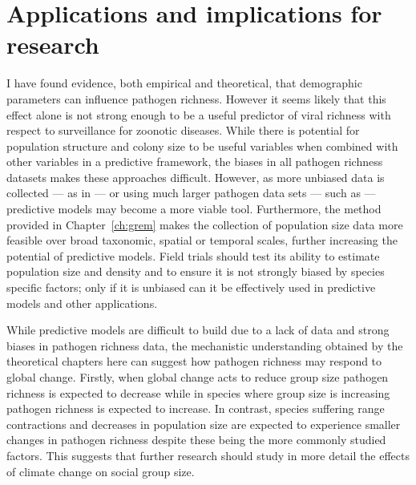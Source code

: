 




\section{Applications and implications for research}

I have found evidence, both empirical and theoretical, that demographic parameters can influence pathogen richness.
However it seems likely that this effect alone is not strong enough to be a useful predictor of viral richness with respect to surveillance for zoonotic diseases.
While there is potential for population structure and colony size to be useful variables when combined with other variables in a predictive framework, the biases in all pathogen richness datasets makes these approaches difficult.
However, as more unbiased data is collected --- as in \textcite{anthony2013strategy, anthony2015non} --- or using much larger pathogen data sets --- such as \textcite{wardeh2015database} --- predictive models may become a more viable tool.
Furthermore, the method provided in Chapter~\ref{ch:grem} makes the collection of population size data more feasible over broad taxonomic, spatial or temporal scales, further increasing the potential of predictive models.
Field trials should test its ability to estimate population size and density and to ensure it is not strongly biased by species specific factors; only if it is unbiased can it be effectively used in predictive models and other applications.

While predictive models are difficult to build due to a lack of data and strong biases in pathogen richness data, the mechanistic understanding obtained by the theoretical chapters here can suggest how pathogen richness may respond to global change.
Firstly, when global change acts to reduce group size \cite{lehmann2010apes, zunino2007habitat, manor2003impact, atwood2006influence} pathogen richness is expected to decrease while in species where group size is increasing \cite{lehmann2010apes} pathogen richness is expected to increase.
In contrast, species suffering range contractions \cite{thomas2004extinction} and decreases in population size \cite{craigie2010large} are expected to experience smaller changes in pathogen richness despite these being the more commonly studied factors.
This suggests that further research should study in more detail the effects of climate change on social group size.


